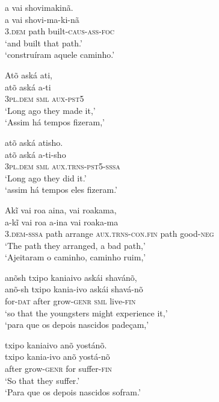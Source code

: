 \documentclass[output=paper,
modfonts,nonflat
]{langsci/langscibook}
\begin{document}
\ea a vai shovimakinã. \\[.3em]
\gll a              vai  shovi-ma-ki-nã              \\
     3.\textsc{dem} path built-\textsc{caus-ass-foc} \\
\glt `and built that path.' \\
`construíram aquele caminho.'\\
\z

\ea Atõ aská ati, \\[.3em]
\gll atõ              aská         a-ti              \\
     \textsc{3pl.dem} \textsc{sml} \textsc{aux-pst5} \\
\glt `Long ago they made it,' \\
`Assim há tempos fizeram,' \\
\z

\ea atõ aská atisho. \\[.3em]
\gll atõ              aská         a-ti-sho                    \\
     3\textsc{pl.dem} \textsc{sml} \textsc{aux.trns-pst5-sssa} \\
\glt `Long ago they did it.' \\
`assim há tempos eles fizeram.' \\
\z

\ea Akĩ vai roa aina, vai roakama, \\[.3em]
\gll a-kĩ                vai  roa     a-ina                     vai  roaka-ma          \\
     3.\textsc{dem-sssa} path arrange \textsc{aux.trns-con.fin} path good-\textsc{neg} \\
\glt `The path they arranged, a bad path,' \\
`Ajeitaram o caminho, caminho ruim,' \\
\z

\newpage 
\ea anõsh txipo kaniaivo askái shavánõ, \\[.3em]
\gll anõ-sh           txipo kania-ivo          askái        shavá-nõ          \\
     for-\textsc{dat} after grow-\textsc{genr} \textsc{sml} live-\textsc{fin} \\
\glt `so that the youngsters might experience it,' \\
`para que os depois nascidos padeçam,'\\
\z

\ea txipo kaniaivo anõ yostánõ. \\[.3em]
\gll txipo kania-ivo          anõ yostá-nõ            \\
     after grow-\textsc{genr} for suffer-\textsc{fin} \\
\glt `So that they suffer.' \\
`Para que os depois nascidos sofram.' \\
\z
\end{document}
